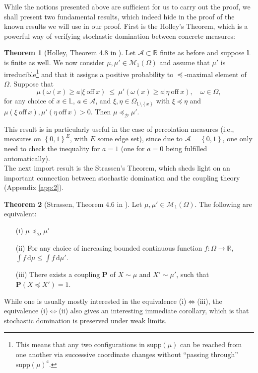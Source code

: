 \documentclass[12pt]{article}
\newcommand{\A}{\mathcal{A}}
\newcommand{\D}{\mathcal{D}}
\renewcommand{\d}{\mathrm{d}}
\renewcommand{\L}{\mathbb{L}}
\newcommand{\M}{\mathcal{M}}
\newcommand{\PP}{\mathbf{P}}
\newcommand{\R}{\mathbb{R}}
\newcommand{\set}[1]{\left\{#1\right\}}
\newcommand{\ra}{\rightarrow}
\newcommand{\1}{\mathbbm{1}}
\renewcommand{\c}{\mathsf{c}}
\newcommand{\supp}{\mathrm{supp}}
\newcommand{\5}{\vspace{0.5cm}}
\theoremstyle{definition}
\newtheorem{thm}{Theorem}[section]
\begin{document}
While the notions presented above are sufficient for us to carry out the proof, we shall present two fundamental results, which indeed hide in the proof of the known results we will use in our proof. First is the Holley's Theorem, which is a powerful way of verifying stochastic domination between concrete measures:
\begin{thm}[Holley, Theorem 4.8 in \cite{GHM}]\label{Holley}
Let $\A\subset\R$ finite as before and suppose $\L$ is finite as well. We now consider $\mu,\mu'\in\M_1(\Omega)$ and assume that $\mu'$ is irreducible\footnote{This means that any two configurations in $\supp(\mu)$ can be reached from one another via successive coordinate changes without ``passing through'' $\supp(\mu)^\c$.} and that it assigns a positive probability to $\preceq$-maximal element of $\Omega$. Suppose that
$$\mu(\omega(x)\geq a|\xi~\text{off}~x) ~\leq~ \mu'(\omega(x)\geq a|\eta~\text{off}~x), \quad \omega\in\Omega,$$
for any choice of $x\in\L$, $a\in \A$, and $\xi,\eta\in\Omega_{\L\setminus\set{x}}$ with $\xi\preceq\eta$ and $\mu(\xi~\text{off}~x),\mu'(\eta~\text{off}~x)>0$. Then $\mu\preceq_\D\mu'$.
\end{thm}

This result is in particularly useful in the case of percolation measures (i.e., measures on $\set{0,1}^E$, with $E$ some edge set), since due to $\A=\set{0,1}$, one only need to check the inequality for $a=1$ (one for $a=0$ being fulfilled automatically). \\

The next import result is the Strassen's Theorem, which sheds light on an important connection between stochastic domination and the coupling theory (Appendix \ref{app:2}). 

\begin{thm}[Strassen, Theorem 4.6 in \cite{GHM}]
Let $\mu,\mu'\in\M_1(\Omega)$. The following are equivalent:
\begin{itemize}
	\item[(i)] $\mu\preceq_\D\mu'$
	\item[(ii)] For any choice of increasing bounded continuous function $f:\Omega\ra\R$, $\int f\,\d\mu\leq \int f\,\d\mu'$.
	\item[(iii)] There exists a coupling $\PP$ of $X\sim\mu$ and $X'\sim\mu'$, such that $\PP(X\preceq X')=1$.
\end{itemize}
\end{thm}

While one is usually mostly interested in the equivalence (i)$\Leftrightarrow$(iii), the equivalence (i)$\Leftrightarrow$(ii) also gives an interesting immediate corollary, which is that stochastic domination is preserved under weak limits.
\end{document}
